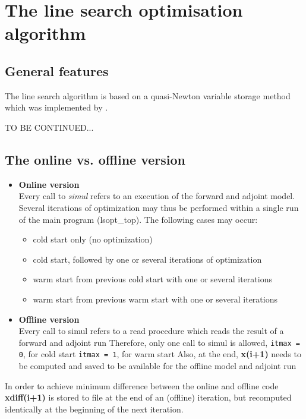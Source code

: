 \section{The line search optimisation algorithm
\label{sectionoptim}}

\subsection{General features}

The line search algorithm is based on a quasi-Newton
variable storage method which was implemented by
\cite{gil-lem:89}.

TO BE CONTINUED...

\subsection{The online vs. offline version}

\begin{itemize}
%
\item {\bf Online version} \\
Every call to {\it simul} refers to an execution of the 
forward and adjoint model.
Several iterations of optimization may thus be performed within
a single run of the main program (lsopt\_top).
The following cases may occur:
%
\begin{itemize}
\item
cold start only (no optimization)
\item
cold start, followed by one or several iterations of optimization
\item
warm start from previous cold start with one or several iterations
\item
warm start from previous warm start with one or several iterations
\end{itemize}
%
\item {\bf Offline version} \\
Every call to simul refers to a read procedure which
reads the result of a forward and adjoint run
Therefore, only one call to simul is allowed,
                     {\tt itmax = 0}, for cold start
                     {\tt itmax = 1}, for warm start
Also, at the end, {\bf x(i+1)} needs to be computed and saved
to be available for the offline model and adjoint run
\end{itemize}

In order to achieve minimum difference between the online and offline code
{\bf xdiff(i+1)} is stored to file at the end of an (offline) iteration,
but recomputed identically at the beginning of the next iteration.

